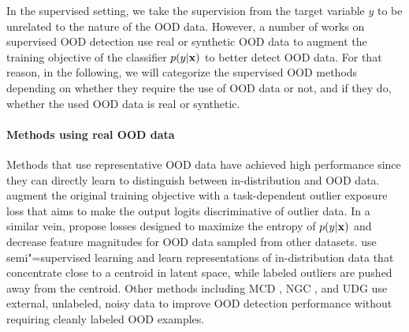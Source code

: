 %
%
In the supervised setting, we take the supervision from the target variable $y$ to be unrelated to the nature of the OOD data. 
However, a number of works on supervised OOD detection use real or synthetic OOD data to augment the training objective of the classifier $p(y|{\mathbf{x}})$ to better detect OOD data. For that reason, in the following, we will categorize the supervised OOD methods depending on whether they require the use of OOD data or not, and if they do, whether the used OOD data is real or synthetic. 

\paragraph{Methods using real OOD data}
Methods that use representative OOD data have achieved high performance since they can directly learn to distinguish between in-distribution and OOD data. 
\textcite{hendrycks_deep_2019} augment the original training objective with a task-dependent outlier exposure loss that aims to make the output logits discriminative of outlier data. 
In a similar vein, \textcite{dhamija_reducing_2018} propose losses designed to maximize the entropy of $p(y|{\mathbf{x}})$ and decrease feature magnitudes for OOD data sampled from other datasets. 
\textcite{ruff_deep_2020} use semi"=supervised learning and learn representations of in-distribution data that concentrate close to a centroid in latent space, while labeled outliers are pushed away from the centroid. 
Other methods including MCD \parencite{yu_unsupervised_2019}, NGC \parencite{wu_ngc_2021}, and UDG \parencite{yang_semantically_2021} use external, unlabeled, noisy data to improve OOD detection performance without requiring cleanly labeled OOD examples. 


